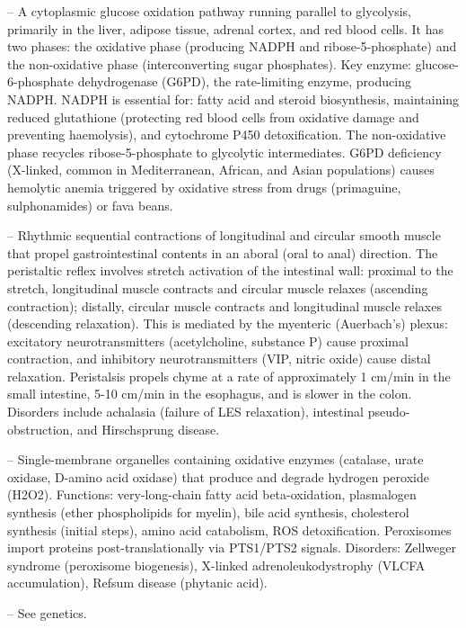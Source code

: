 -- A cytoplasmic glucose oxidation pathway running parallel to glycolysis, primarily in the liver, adipose tissue, adrenal cortex, and red blood cells. It has two phases: the oxidative phase (producing NADPH and ribose-5-phosphate) and the non-oxidative phase (interconverting sugar phosphates). Key enzyme: glucose-6-phosphate dehydrogenase (G6PD), the rate-limiting enzyme, producing NADPH. NADPH is essential for: fatty acid and steroid biosynthesis, maintaining reduced glutathione (protecting red blood cells from oxidative damage and preventing haemolysis), and cytochrome P450 detoxification. The non-oxidative phase recycles ribose-5-phosphate to glycolytic intermediates. G6PD deficiency (X-linked, common in Mediterranean, African, and Asian populations) causes hemolytic anemia triggered by oxidative stress from drugs (primaguine, sulphonamides) or fava beans.

-- Rhythmic sequential contractions of longitudinal and circular smooth muscle that propel gastrointestinal contents in an aboral (oral to anal) direction. The peristaltic reflex involves stretch activation of the intestinal wall: proximal to the stretch, longitudinal muscle contracts and circular muscle relaxes (ascending contraction); distally, circular muscle contracts and longitudinal muscle relaxes (descending relaxation). This is mediated by the myenteric (Auerbach's) plexus: excitatory neurotransmitters (acetylcholine, substance P) cause proximal contraction, and inhibitory neurotransmitters (VIP, nitric oxide) cause distal relaxation. Peristalsis propels chyme at a rate of approximately 1 cm/min in the small intestine, 5-10 cm/min in the esophagus, and is slower in the colon. Disorders include achalasia (failure of LES relaxation), intestinal pseudo-obstruction, and Hirschsprung disease.

-- Single-membrane organelles containing oxidative enzymes (catalase, urate oxidase, D-amino acid oxidase) that produce and degrade hydrogen peroxide (H2O2). Functions: very-long-chain fatty acid beta-oxidation, plasmalogen synthesis (ether phospholipids for myelin), bile acid synthesis, cholesterol synthesis (initial steps), amino acid catabolism, ROS detoxification. Peroxisomes import proteins post-translationally via PTS1/PTS2 signals. Disorders: Zellweger syndrome (peroxisome biogenesis), X-linked adrenoleukodystrophy (VLCFA accumulation), Refsum disease (phytanic acid).

-- See genetics.

